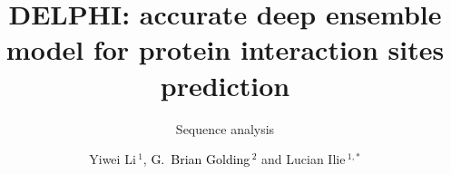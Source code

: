 \documentclass{bioinfo}
\newcommand{\mySecondColor}{black}
\begin{document}
\subtitle{Sequence analysis}

\title[Protein interaction sites prediction]{DELPHI: accurate deep ensemble model for protein interaction sites prediction}
\author[Y.Li et al.]{Yiwei Li\,$^1$, 
\textcolor{\mySecondColor}{G.~Brian Golding\,$^2$}
 and Lucian Ilie\,$^{1,*}$}
\address{$^1$Department of Computer Science, The University of Western Ontario London, ON, N6A 5B7, Canada \textcolor{\mySecondColor}{and $^2$Department of Biology, McMaster University, Hamilton, Ontario, Canada
L8S 4K1}}



\end{document}
